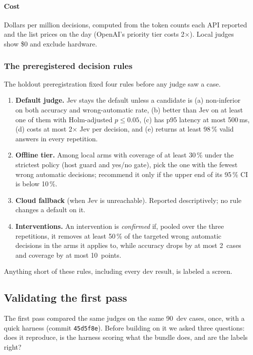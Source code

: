 \documentclass[11pt,letterpaper]{article}
\newcommand{\code}[1]{\texttt{#1}}
\newcommand{\DevN}{90}
\newcommand{\FpHarnessCommit}{45d5f8e}
\newcommand{\IConfirmAccCases}{2}
\newcommand{\IConfirmCovPts}{10}
\newcommand{\IConfirmReductionPct}{50}
\newcommand{\OffMaxUpperPct}{10}
\newcommand{\OffMinCovPct}{30}
\newcommand{\PriorityMultiplier}{2}
\newcommand{\RuleOneCostX}{2}
\newcommand{\RuleOneMaxPninetyfive}{500}
\newcommand{\RuleOneValidShare}{98}
\begin{document}
\paragraph{Cost} Dollars per million decisions, computed from the token counts each API reported and
the list prices on the day (OpenAI's priority tier costs \PriorityMultiplier$\times$). Local judges
show \$0 and exclude hardware.

\subsubsection{The preregistered decision rules}\label{jb:sec:rules}

The holdout preregistration fixed four rules before any judge saw a case.
\begin{enumerate}
  \item \textbf{Default judge.} Jev stays the default unless a candidate is (a) non-inferior on both
    accuracy and wrong-automatic rate, (b) better than Jev on at least one of them with Holm-adjusted
    $p \le 0.05$, (c) has p95 latency at most \RuleOneMaxPninetyfive\,ms, (d) costs at most
    \RuleOneCostX$\times$ Jev per decision, and (e) returns at least \RuleOneValidShare\,\% valid answers
    in every repetition.
  \item \textbf{Offline tier.} Among local arms with coverage of at least \OffMinCovPct\,\% under the
    strictest policy (host guard and yes/no gate), pick the one with the fewest wrong automatic
    decisions; recommend it only if the upper end of its 95\,\% CI is below \OffMaxUpperPct\,\%.
  \item \textbf{Cloud fallback} (when Jev is unreachable). Reported descriptively; no rule changes a
    default on it.
  \item \textbf{Interventions.} An intervention is \emph{confirmed} if, pooled over the three
    repetitions, it removes at least \IConfirmReductionPct\,\% of the targeted wrong automatic decisions in the
    arms it applies to, while accuracy drops by at most \IConfirmAccCases\ cases and coverage by at most
    \IConfirmCovPts\ points.
\end{enumerate}
Anything short of these rules, including every dev result, is labeled a screen.
\subsection{Validating the first pass}\label{jb:sec:validate}

The first pass compared the same judges on the same \DevN\ dev cases, once, with a quick harness
(commit \code{\FpHarnessCommit}). Before building on it we asked three questions: does it reproduce, is
the harness scoring what the bundle does, and are the labels right?
\end{document}
